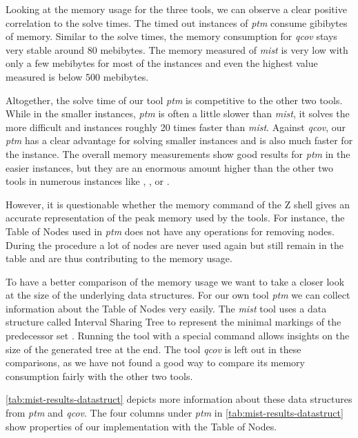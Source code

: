Looking at the memory usage for the three tools, we can observe a clear positive correlation to the solve times. The timed out instances of \textit{ptm} consume gibibytes of memory. Similar to the solve times, the memory consumption for \textit{qcov} stays very stable around 80 mebibytes. The memory measured of \textit{mist} is very low with only a few mebibytes for most of the instances and even the highest value measured is below 500 mebibytes.

Altogether, the solve time of our tool \textit{ptm} is competitive to the other two tools. While in the smaller instances, \textit{ptm} is often a little slower than \textit{mist}, it solves the more difficult  and  instances roughly 20 times faster than \textit{mist}.
Against \textit{qcov}, our \textit{ptm} has a clear advantage for solving smaller instances and is also much faster for the  instance.
The overall memory measurements show good results for \textit{ptm} in the easier instances, but they are an enormous amount higher than the other two tools in numerous instances like , , or .

\bigbreak

However, it is questionable whether the memory command of the Z shell gives an accurate representation of the peak memory used by the tools. For instance, the Table of Nodes used in \textit{ptm} does not have any operations for removing nodes. During the procedure a lot of nodes are never used again but still remain in the table and are thus contributing to the memory usage.

To have a better comparison of the memory usage we want to take a closer look at the size of the underlying data structures. For our own tool \textit{ptm} we can collect information about the Table of Nodes very easily. The \textit{mist} tool uses a data structure called Interval Sharing Tree to represent the minimal markings of the predecessor set \cite{ganty_07,ganty_15}. Running the tool with a special command allows insights on the size of the generated tree at the end. 
The tool \textit{qcov} is left out in these comparisons, as we have not found a good way to compare its memory consumption fairly with the other two tools. 
\bigbreak

\autoref{tab:mist-results-datastruct} depicts more information about these data structures from \textit{ptm} and \textit{qcov}.
The four columns under \textit{ptm} in \autoref{tab:mist-results-datastruct} show properties of our implementation with the Table of Nodes.

